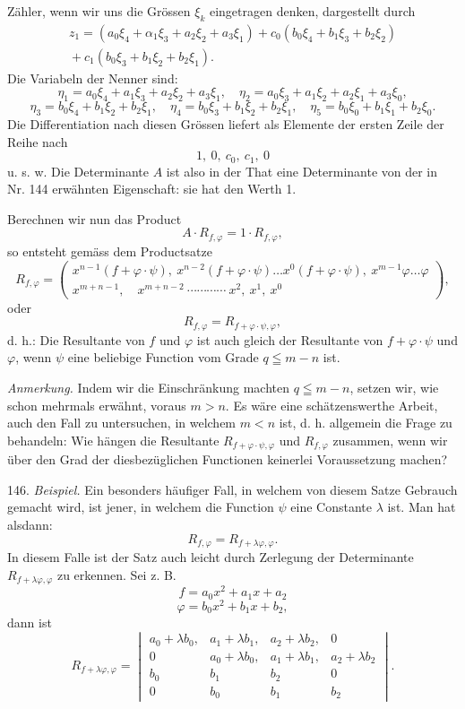 \documentclass[11pt]{article}
\providecommand{\weberpage}[1]{}
\providecommand{\weq}[2]{\begin{equation}\tag{#1}#2\end{equation}}
\begin{document}
\weberpage{151}
Z\"ahler, wenn wir uns die Gr\"ossen $\xi_k$ eingetragen denken, dargestellt
durch
\[
\begin{aligned}
z_1 = (a_0\xi_4 + \alpha_1\xi_3 + a_2\xi_2 + a_3\xi_1) + c_0(b_0\xi_4 + b_1\xi_3 + b_2\xi_2)\\
{} + c_1(b_0\xi_3 + b_1\xi_2 + b_2\xi_1).
\end{aligned}
\]
Die Variabeln der Nenner sind:
\[
\eta_1 = a_0\xi_4 + a_1\xi_3 + a_2\xi_2 + a_3\xi_1,\quad
\eta_2 = a_0\xi_3 + a_1\xi_2 + a_2\xi_1 + a_3\xi_0,
\]
\[
\eta_3 = b_0\xi_4 + b_1\xi_2 + b_2\xi_1,\quad
\eta_4 = b_0\xi_3 + b_1\xi_2 + b_2\xi_1,\quad
\eta_5 = b_0\xi_0 + b_1\xi_1 + b_2\xi_0.
\]
Die Differentiation nach diesen Gr\"ossen liefert als Elemente der ersten
Zeile der Reihe nach
\[
1,\ 0,\ c_0,\ c_1,\ 0
\]
u. s. w. Die Determinante $A$ ist also in der That eine Determinante
von der in Nr. 144 erw\"ahnten Eigenschaft: sie hat den Werth 1.

Berechnen wir nun das Product
\[
A \cdot R_{f,\varphi} = 1 \cdot R_{f,\varphi},
\]
so entsteht gem\"ass dem Productsatze
\[
R_{f,\varphi} = \left(\begin{array}{l}
x^{n-1}(f+\varphi\cdot\psi),\ x^{n-2}(f+\varphi\cdot\psi)\ldots x^0(f+\varphi\cdot\psi),\ x^{m-1}\varphi\ldots\varphi\\[2pt]
x^{m+n-1},\quad x^{m+n-2}\ \cdots\cdots\cdots\cdots\ x^2,\ x^1,\ x^0
\end{array}\right),
\]
oder
\weq{I}{R_{f,\varphi} = R_{f+\varphi\cdot\psi,\varphi},}
d. h.: \glqq Die Resultante von $f$ und $\varphi$ ist auch gleich der
Resultante von $f+\varphi\cdot\psi$ und $\varphi$, wenn $\psi$ eine
beliebige Function vom Grade $q\leqq m-n$ ist.\grqq{}

\textit{Anmerkung.} Indem wir die Einschr\"ankung machten $q\leqq m-n$,
setzen wir, wie schon mehrmals erw\"ahnt, voraus $m>n$. Es w\"are
eine sch\"atzenswerthe Arbeit, auch den Fall zu untersuchen, in welchem
$m<n$ ist, d. h. allgemein die Frage zu behandeln: Wie h\"angen die
Resultante $R_{f+\varphi\cdot\psi,\varphi}$ und $R_{f,\varphi}$ zusammen,
wenn wir \"uber den Grad der diesbez\"uglichen Functionen keinerlei
Voraussetzung machen?

146. \textit{Beispiel.} Ein besonders h\"aufiger Fall, in welchem von
diesem Satze Gebrauch gemacht wird, ist jener, in welchem die Function
$\psi$ eine Constante $\lambda$ ist. Man hat alsdann:
\[
R_{f,\varphi} = R_{f+\lambda\varphi,\varphi}.
\]
In diesem Falle ist der Satz auch leicht durch Zerlegung der
Determinante $R_{f+\lambda\varphi,\varphi}$ zu erkennen. Sei z. B.
\[
f = a_0x^2 + a_1x + a_2
\]
\[
\varphi = b_0x^2 + b_1x + b_2,
\]
dann ist
\[
R_{f+\lambda\varphi,\varphi} = \begin{vmatrix}
a_0+\lambda b_0, & a_1+\lambda b_1, & a_2+\lambda b_2, & 0\\
0 & a_0+\lambda b_0, & a_1+\lambda b_1, & a_2+\lambda b_2\\
b_0 & b_1 & b_2 & 0\\
0 & b_0 & b_1 & b_2
\end{vmatrix}.
\]
\end{document}
